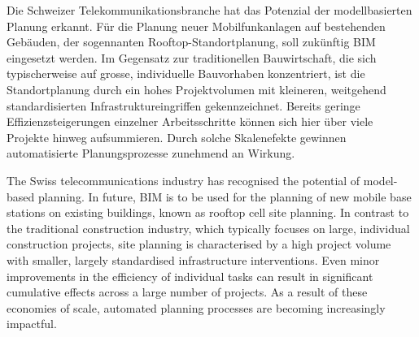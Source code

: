 \begin{German}
    Die Schweizer Telekommunikationsbranche hat das Potenzial der modellbasierten Planung erkannt. Für die Planung neuer Mobilfunkanlagen auf bestehenden Gebäuden, der sogennanten Rooftop-Standortplanung, soll zukünftig BIM eingesetzt werden. Im Gegensatz zur traditionellen Bauwirtschaft, die sich typischerweise auf grosse, individuelle Bauvorhaben konzentriert, ist die Standortplanung durch ein hohes Projektvolumen mit kleineren, weitgehend standardisierten Infrastruktureingriffen gekennzeichnet. Bereits geringe Effizienzsteigerungen einzelner Arbeitsschritte können sich hier über viele Projekte hinweg aufsummieren. Durch solche Skalenefekte gewinnen automatisierte Planungsprozesse zunehmend an Wirkung.
\end{German}

\begin{English}
    The Swiss telecommunications industry has recognised the potential of model-based planning. In future, BIM is to be used for the planning of new mobile base stations on existing buildings, known as rooftop cell site planning. In contrast to the traditional construction industry, which typically focuses on large, individual construction projects, site planning is characterised by a high project volume with smaller, largely standardised infrastructure interventions. Even minor improvements in the efficiency of individual tasks can result in significant cumulative effects across a large number of projects. As a result of these economies of scale, automated planning processes are becoming increasingly impactful.
\end{English}

